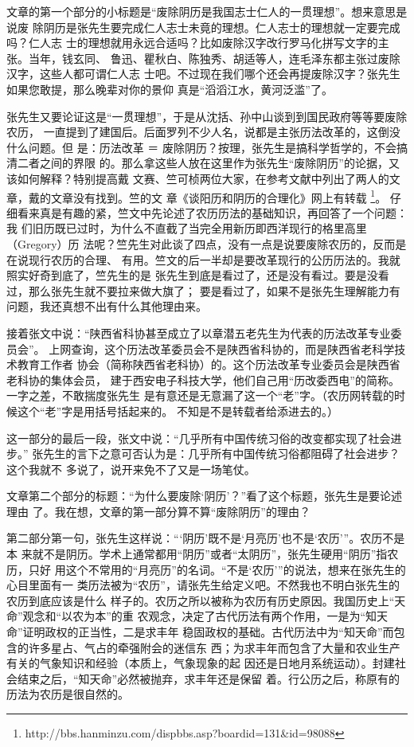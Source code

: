 文章的第一个部分的小标题是“废除阴历是我国志士仁人的一贯理想”。想来意思是说废
除阴历是张先生要完成仁人志士未竟的理想。仁人志士的理想就一定要完成吗？仁人志
士的理想就用永远合适吗？比如废除汉字改行罗马化拼写文字的主张。当年，钱玄同、
鲁迅、瞿秋白、陈独秀、胡适等人，连毛泽东都主张过废除汉字，这些人都可谓仁人志
士吧。不过现在我们哪个还会再提废除汉字？张先生如果您敢提，那么晚辈对你的景仰
真是“滔滔江水，黄河泛滥”了。

张先生又要论证这是“一贯理想”，于是从沈括、孙中山谈到到国民政府等等要废除农历，
一直提到了建国后。后面罗列不少人名，说都是主张历法改革的，这倒没什么问题。但
是：历法改革 ＝ 废除阴历？按理，张先生是搞科学哲学的，不会搞清二者之间的界限
的。那么拿这些人放在这里作为张先生“废除阴历”的论据，又该如何解释？特别提高戴
文赛、竺可桢两位大家，在参考文献中列出了两人的文章，戴的文章没有找到。竺的文
章《谈阳历和阴历的合理化》网上有转载
\footnote{http://bbs.hanminzu.com/dispbbs.asp?boardid=131\&id=98088}。
仔细看来真是有趣的紧，竺文中先论述了农历历法的基础知识，再回答了一个问题：我
们旧历既已过时，为什么不直截了当完全用新历即西洋现行的格里高里（Gregory）历
法呢？竺先生对此谈了四点，没有一点是说要废除农历的，反而是在说现行农历的合理、
有用。竺文的后一半却是要改革现行的公历历法的。我就照实好奇到底了，竺先生的是
张先生到底是看过了，还是没有看过。要是没看过，那么张先生就不要拉来做大旗了；
要是看过了，如果不是张先生理解能力有问题，我还真想不出有什么其他理由来。

接着张文中说：“陕西省科协甚至成立了以章潜五老先生为代表的历法改革专业委员会”。
上网查询，这个历法改革委员会不是陕西省科协的，而是陕西省老科学技术教育工作者
协会（简称陕西省老科协）的。这个历法改革专业委员会是陕西省老科协的集体会员，
建于西安电子科技大学，他们自己用“历改委西电”的简称。一字之差，不敢揣度张先生
是有意还是无意漏了这一个“老”字。（农历网转载的时候这个“老”字是用括号括起来的。
不知是不是转载者给添进去的。）

这一部分的最后一段，张文中说：“几乎所有中国传统习俗的改变都实现了社会进步。”
张先生的言下之意可否认为是：几乎所有中国传统习俗都阻碍了社会进步？这个我就不
多说了，说开来免不了又是一场笔仗。

文章第二个部分的标题：“为什么要废除‘阴历’？”看了这个标题，张先生是要论述理由
了。我在想，文章的第一部分算不算“废除阴历”的理由？

第二部分第一句，张先生这样说：“‘阴历’既不是‘月亮历’也不是‘农历’”。农历不是本
来就不是阴历。学术上通常都用“阴历”或者“太阴历”，张先生硬用“阴历”指农历，只好
用这个不常用的“月亮历”的名词。“不是‘农历’”的说法，想来在张先生的心目里面有一
类历法被为“农历”，请张先生给定义吧。不然我也不明白张先生的农历到底应该是什么
样子的。农历之所以被称为农历有历史原因。我国历史上“天命”观念和“以农为本”的重
农观念，决定了古代历法有两个作用，一是为“知天命”证明政权的正当性，二是求丰年
稳固政权的基础。古代历法中为“知天命”而包含的许多星占、气占的牵强附会的迷信东
西；为求丰年而包含了大量和农业生产有关的气象知识和经验（本质上，气象现象的起
因还是日地月系统运动）。封建社会结束之后，“知天命”必然被抛弃，求丰年还是保留
着。行公历之后，称原有的历法为农历是很自然的。


